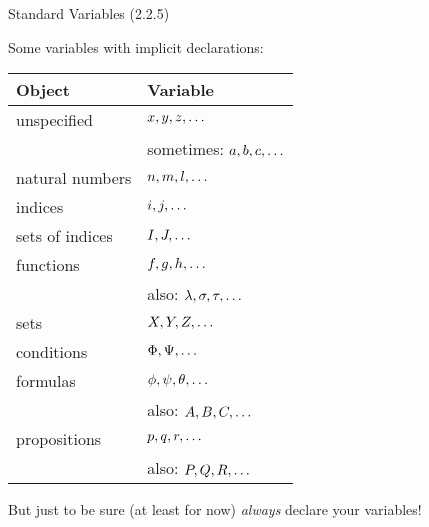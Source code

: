 \begin{frame}{Standard Variables (2.2.5)}

Some variables with implicit declarations:

	\begin{center}
	\begin{tabular}{l | l}
			Object & Variable\\\hline
			
			unspecified & $x,y,z,\mathellipsis$\\
			
					& sometimes: $a,b,c, \mathellipsis$\\
			
			natural numbers & $n,m,l,\mathellipsis$\\
			
			indices & $i,j,\mathellipsis$ \\
			
			sets of indices & $I,J,\mathellipsis$\\
			
			functions & $f,g,h,\mathellipsis$\\
			
					& also: $\lambda, \sigma,\tau,\mathellipsis$\\
			
			sets & $X,Y,Z,\mathellipsis$ \\
			
			conditions & $\Phi,\Psi,\mathellipsis$\\
			
			formulas	 & $\phi,\psi,\theta,\mathellipsis$\\
			
					& also: $A,B,C, \mathellipsis$\\
					
			propositions & $p,q,r, \mathellipsis$\\
					& also: $P,Q,R,\mathellipsis$
			
			\end{tabular}
		\end{center}

But just to be sure (at least for now) \emph{always} declare your variables!		
		
\end{frame}

